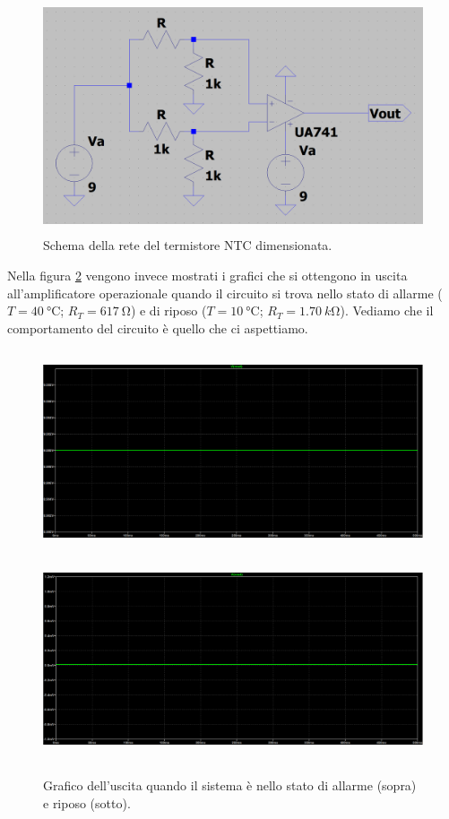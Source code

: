 \documentclass{report}
\begin{document}
\begin{figure}[h!]
	\centering
	\includegraphics[height=6.9cm]{immagini/dimNTC}
	\caption{Schema della rete del termistore NTC dimensionata.} 
	\label{figura:dimNTC}
\end{figure}
Nella figura \ref{figura:NTCout} vengono invece mostrati i grafici che si ottengono in uscita all'amplificatore operazionale quando il circuito si trova nello stato di allarme ($T = \SI{40}{\celsius}$; $R_T=\SI{617}{\ohm}$) e di riposo ($T = \SI{10}{\celsius}$; $R_T=\SI{1.70}{k\ohm}$). Vediamo che il comportamento del circuito è quello che ci aspettiamo. \par
\begin{figure}[h!]
	\centering
	\includegraphics[height=6cm]{immagini/NTCon}
	\includegraphics[height=6cm]{immagini/NTCoff}
	\caption{Grafico dell'uscita quando il sistema è nello stato di allarme (sopra) e riposo (sotto).} 
	\label{figura:NTCout}
\end{figure}
\end{document}
